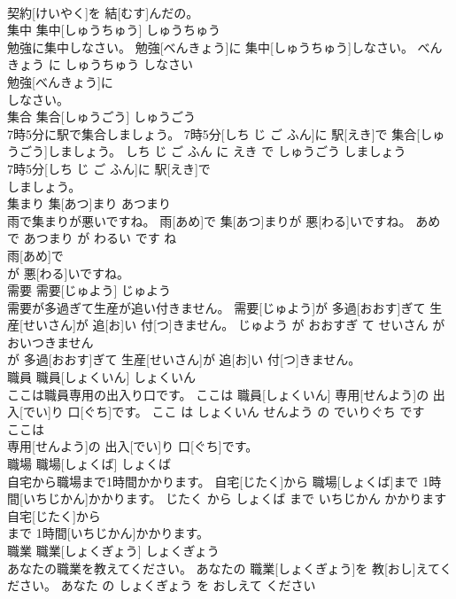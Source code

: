 \documentclass[8pt]{extreport}
\begin{document}
\begin{CJK}{UTF8}{min}
\\	契約[けいやく]を 結[むす]んだの。			
\\	集中	集中[しゅうちゅう]	しゅうちゅう	
\\	勉強に集中しなさい。	勉強[べんきょう]に 集中[しゅうちゅう]しなさい。	べんきょう に しゅうちゅう しなさい	
\\	勉強[べんきょう]に
\\	しなさい。			
\\	集合	集合[しゅうごう]	しゅうごう	
\\	7時5分に駅で集合しましょう。	7時5分[しち じ ご ふん]に 駅[えき]で 集合[しゅうごう]しましょう。	しち じ ご ふん に えき で しゅうごう しましょう	
\\	7時5分[しち じ ご ふん]に 駅[えき]で
\\	しましょう。			
\\	集まり	集[あつ]まり	あつまり	
\\	雨で集まりが悪いですね。	雨[あめ]で 集[あつ]まりが 悪[わる]いですね。	あめ で あつまり が わるい です ね	
\\	雨[あめ]で
\\	が 悪[わる]いですね。			
\\	需要	需要[じゅよう]	じゅよう	
\\	需要が多過ぎて生産が追い付きません。	需要[じゅよう]が 多過[おおす]ぎて 生産[せいさん]が 追[お]い 付[つ]きません。	じゅよう が おおすぎ て せいさん が おいつきません	
\\	が 多過[おおす]ぎて 生産[せいさん]が 追[お]い 付[つ]きません。			
\\	職員	職員[しょくいん]	しょくいん	
\\	ここは職員専用の出入り口です。	ここは 職員[しょくいん] 専用[せんよう]の 出入[でい]り 口[ぐち]です。	ここ は しょくいん せんよう の でいりぐち です	
\\	ここは
\\	専用[せんよう]の 出入[でい]り 口[ぐち]です。			
\\	職場	職場[しょくば]	しょくば	
\\	自宅から職場まで1時間かかります。	自宅[じたく]から 職場[しょくば]まで 1時間[いちじかん]かかります。	じたく から しょくば まで いちじかん かかります	
\\	自宅[じたく]から
\\	まで 1時間[いちじかん]かかります。			
\\	職業	職業[しょくぎょう]	しょくぎょう	
\\	あなたの職業を教えてください。	あなたの 職業[しょくぎょう]を 教[おし]えてください。	あなた の しょくぎょう を おしえて ください	

\end{CJK}
\end{document}
